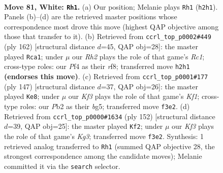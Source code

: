 \documentclass[11pt]{article}
\begin{document}
\clearpage

\begin{figure}[p]\centering
\begin{subfigure}{0.46\textwidth}\centering
\resizebox{\linewidth}{!}{%
\newchessgame
\chessboard[
  setfen={8/6r1/p7/Pppk1p1p/2p2P1P/4PKP1/1P5R/8 w - - 7 81},
  showmover=false,
  pgfstyle=straightmove, color=movearrow, markmove={h2-h1}
]}
\caption{}
\end{subfigure}\hfill
\begin{subfigure}{0.46\textwidth}\centering
\resizebox{\linewidth}{!}{%
\newchessgame
\chessboard[
  setfen={5r2/R4p2/4p1k1/3p1p1p/3P3P/4PKP1/1r3P2/2R5 w - - 16 82},
  showmover=false,
  pgfstyle=straightmove, color=movearrow, markmove={c1-a1}
]}
\caption{}
\end{subfigure}
\\[4pt]
\begin{subfigure}{0.46\textwidth}\centering
\resizebox{\linewidth}{!}{%
\newchessgame
\chessboard[
  setfen={5k2/1pr2p2/p1p1p1p1/P3P1Bp/2PP4/3K4/8/7R b - - 7 74},
  showmover=false,
  pgfstyle=straightmove, color=movearrow, markmove={f8-e8}
]}
\caption{}
\end{subfigure}\hfill
\begin{subfigure}{0.46\textwidth}\centering
\resizebox{\linewidth}{!}{%
\newchessgame
\chessboard[
  setfen={5r2/2p5/1p1p2pk/p2Pp1p1/P3P3/1PP2PKP/2R5/8 w - - 31 77},
  showmover=false,
  pgfstyle=straightmove, color=movearrow, markmove={g3-f2}
]}
\caption{}
\end{subfigure}
\caption{\textbf{Move 81, White: \texttt{Rh1}.} (a) Our position; Melanie plays \texttt{Rh1} (\texttt{h2h1}). Panels (b)--(d) are the retrieved master positions whose correspondence most drove this move (highest QAP objective among those that transfer to it). (b) Retrieved from \texttt{ccrl\_top\_p0002\#449} (ply 162) [structural distance $d$=45, QAP obj=28]: the master played \texttt{Rca1}; under $\mu$ our \emph{Rh2} plays the role of that game's \emph{Rc1}; cross-type roles: our \emph{P}f4 as their \emph{r}f8; transferred move \texttt{h2h1} \textbf{(endorses this move)}. (c) Retrieved from \texttt{ccrl\_top\_p0001\#177} (ply 147) [structural distance $d$=37, QAP obj=26]: the master played \texttt{Ke8}; under $\mu$ our \emph{Kf3} plays the role of that game's \emph{Kf1}; cross-type roles: our \emph{P}b2 as their \emph{b}g5; transferred move \texttt{f3e2}. (d) Retrieved from \texttt{ccrl\_top\_p0000\#1634} (ply 152) [structural distance $d$=39, QAP obj=25]: the master played \texttt{Kf2}; under $\mu$ our \emph{Kf3} plays the role of that game's \emph{Kg3}; transferred move \texttt{f3e2}. Synthesis: 1 retrieved analog transferred to \texttt{Rh1} (summed QAP objective 28, the strongest correspondence among the candidate moves); Melanie committed it via the \texttt{search} selector.}
\label{fig:thought-m160}
\end{figure}
\end{document}

